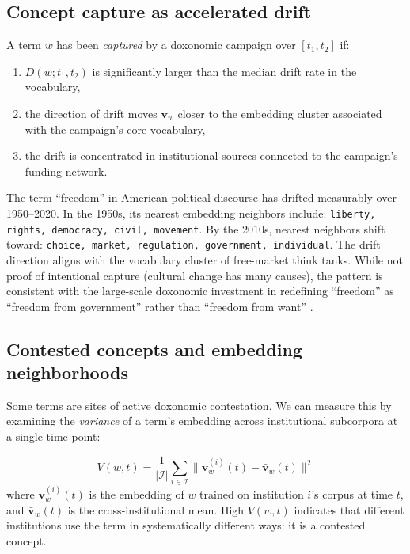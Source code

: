 \subsection{Concept capture as accelerated drift}

\begin{proposition}
\label{prop:concept-capture}
A term $w$ has been \emph{captured} by a doxonomic campaign over $[t_1, t_2]$ if:
\begin{enumerate}[nosep]
  \item $D(w; t_1, t_2)$ is significantly larger than the median drift rate in the vocabulary,
  \item the direction of drift moves $\bm{v}_w$ closer to the embedding cluster associated with the campaign's core vocabulary,
  \item the drift is concentrated in institutional sources connected to the campaign's funding network.
\end{enumerate}
\end{proposition}

\begin{example}
\label{ex:freedom-drift}
The term ``freedom'' in American political discourse has drifted measurably over 1950--2020.
In the 1950s, its nearest embedding neighbors include: \texttt{liberty, rights, democracy, civil, movement}.
By the 2010s, nearest neighbors shift toward: \texttt{choice, market, regulation, government, individual}.
The drift direction aligns with the vocabulary cluster of free-market think tanks.
While not proof of intentional capture (cultural change has many causes), the pattern is consistent with the large-scale doxonomic investment in redefining ``freedom'' as ``freedom from government'' rather than ``freedom from want'' \autocite{fourcade2009}.
\end{example}

\subsection{Contested concepts and embedding neighborhoods}

Some terms are sites of active doxonomic contestation.
We can measure this by examining the \emph{variance} of a term's embedding across institutional subcorpora at a single time point:

\[
  V(w, t) = \frac{1}{|\mathcal{I}|} \sum_{i \in \mathcal{I}} \|\bm{v}_w^{(i)}(t) - \bar{\bm{v}}_w(t)\|^2
\]
where $\bm{v}_w^{(i)}(t)$ is the embedding of $w$ trained on institution $i$'s corpus at time $t$, and $\bar{\bm{v}}_w(t)$ is the cross-institutional mean.
High $V(w, t)$ indicates that different institutions use the term in systematically different ways: it is a contested concept.

